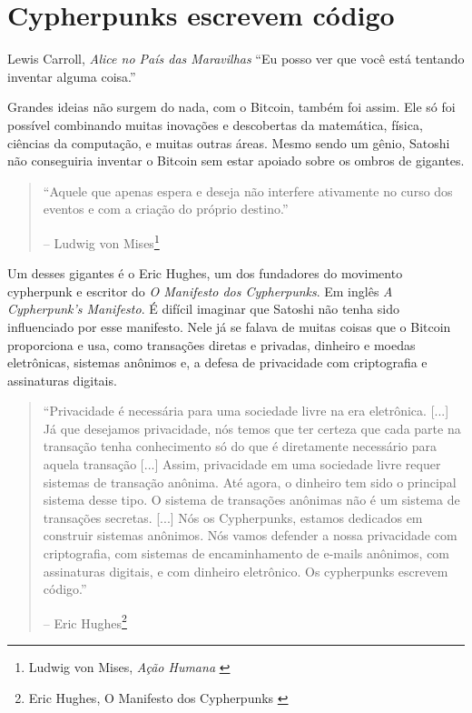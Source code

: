 \chapter{Cypherpunks escrevem código}
\label{les:20}

\begin{chapquote}{Lewis Carroll, \textit{Alice no País das Maravilhas}}
\enquote{Eu posso ver que você está tentando inventar alguma coisa.}
\end{chapquote}

Grandes ideias não surgem do nada, com o Bitcoin, também foi assim. 
Ele só foi possível combinando muitas inovações e descobertas da matemática, 
física, ciências da computação, e muitas outras áreas. Mesmo sendo um gênio, 
Satoshi não conseguiria inventar o Bitcoin sem estar apoiado sobre os ombros de gigantes.

\begin{quotation}\begin{samepage}
\enquote{Aquele que apenas espera e deseja não interfere ativamente no curso dos eventos e com a criação do próprio destino.}
\begin{flushright} -- Ludwig von Mises\footnote{Ludwig von Mises, \textit{Ação Humana} \cite{human-action}}
\end{flushright}\end{samepage}\end{quotation}

Um desses gigantes é o Eric Hughes, um dos fundadores do movimento cypherpunk
e escritor do \textit{O Manifesto dos Cypherpunks}. Em inglês \textit{A Cypherpunk's Manifesto}. 
É difícil imaginar que Satoshi não tenha sido influenciado por esse manifesto. Nele já se falava de muitas coisas que o Bitcoin proporciona e usa, como transações diretas e privadas, dinheiro e moedas eletrônicas, sistemas anônimos e, a defesa de privacidade com criptografia e assinaturas digitais.

\begin{quotation}\begin{samepage}
\enquote{Privacidade é necessária para uma sociedade livre na era eletrônica.
	[...] Já que desejamos privacidade, nós temos que ter certeza que cada parte 
	na transação tenha conhecimento só do que é diretamente necessário para 
	aquela transação [...]
	Assim, privacidade em uma sociedade livre requer sistemas de transação anônima. 
	Até agora, o dinheiro tem sido o principal sistema desse tipo.
	O sistema de transações anônimas não é um sistema de transações secretas. [...]
	Nós os Cypherpunks, estamos dedicados em construir sistemas anônimos. Nós vamos 
	defender a nossa privacidade com criptografia, com sistemas de encaminhamento 
	de e-mails anônimos, com assinaturas digitais, e com dinheiro eletrônico. 
	Os cypherpunks escrevem código.}

\begin{flushright} -- Eric Hughes\footnote{Eric Hughes, O Manifesto dos Cypherpunks \cite{cypherpunk-manifesto}}
\end{flushright}\end{samepage}\end{quotation}

